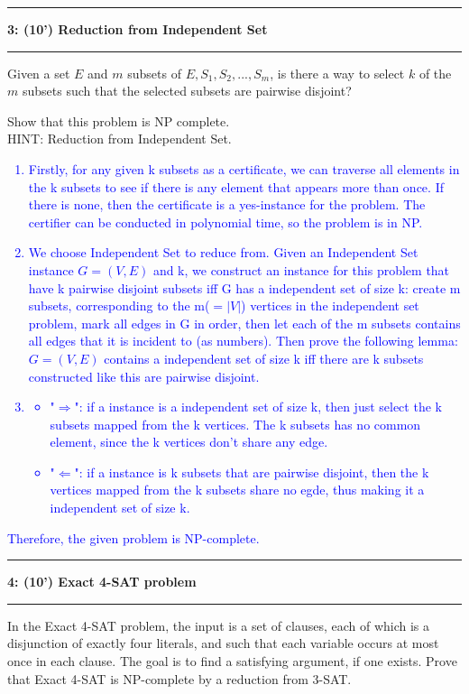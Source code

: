 \documentclass{article}
\newcommand\question[2]{\vspace{.25in}\hrule\textbf{#1: #2}\vspace{.5em}\hrule\vspace{.10in}}
\begin{document}

\question{3}{(10') Reduction from Independent Set}
Given a set $E$ and $m$ subsets of $E, S_1, S_2,..., S_m$, is there a way to select $k$ of the $m$ subsets such that the selected subsets are pairwise disjoint?

Show that this problem is NP complete. \\
HINT: Reduction from Independent Set.

\textcolor{blue}{
	\begin{enumerate}
		\item Firstly, for any given k subsets as a certificate, we can traverse all elements in the k subsets to see if there is any element that appears more than once. If there is none, then the certificate is a yes-instance for the problem. The certifier can be conducted in polynomial time, so the problem is in NP.
		\item We choose Independent Set to reduce from. Given an Independent Set instance $G=(V,E)$ and k, we construct an instance for this problem that have k pairwise disjoint subsets iff G has a independent set of size k: create m subsets, corresponding to the m($=|V|$) vertices in the independent set problem, mark all edges in G in order, then let each of the m subsets contains all edges that it is incident to (as numbers). Then prove the following lemma: $G=(V,E)$ contains a independent set of size k iff there are k subsets constructed like this are pairwise disjoint.
		\item \begin{itemize}
			      \item "$\Rightarrow$": if a instance is a independent set of size k, then just select the k subsets mapped from the k vertices. The k subsets has no common element, since the k vertices don't share any edge.
			      \item "$\Leftarrow$": if a instance is k subsets that are pairwise disjoint, then the k vertices mapped from the k subsets share no egde, thus making it a independent set of size k.
		      \end{itemize}
	\end{enumerate}
	Therefore, the given problem is NP-complete.
}

\pagebreak
\question{4}{(10') Exact 4-SAT problem}

In the Exact 4-SAT problem, the input is a set of clauses, each of which is a disjunction of exactly four literals, and such that each variable occurs at most once in each clause. The goal is to find a satisfying argument, if one exists. Prove that Exact 4-SAT is NP-complete by a reduction from 3-SAT.
\end{document}
